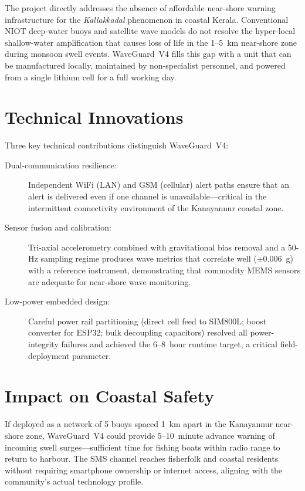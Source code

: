 The project directly addresses the absence of affordable near-shore warning
infrastructure for the \textit{Kallakkadal} phenomenon in coastal Kerala.
Conventional NIOT deep-water buoys and satellite wave models do not resolve the
hyper-local shallow-water amplification that causes loss of life in the 1--5~km
near-shore zone during monsoon swell events.
WaveGuard~V4 fills this gap with a unit that can be manufactured locally, maintained
by non-specialist personnel, and powered from a single lithium cell for a full working day.

\section{Technical Innovations}

Three key technical contributions distinguish WaveGuard~V4:

\begin{description}
  \item[Dual-communication resilience:]
        Independent WiFi (LAN) and GSM (cellular) alert paths ensure that an alert
        is delivered even if one channel is unavailable---critical in the intermittent
        connectivity environment of the Kanayannur coastal zone.

  \item[Sensor fusion and calibration:]
        Tri-axial accelerometry combined with gravitational bias removal and a 50-Hz
        sampling regime produces wave metrics that correlate well ($\pm$0.006~g) with
        a reference instrument, demonstrating that commodity MEMS sensors are
        adequate for near-shore wave monitoring.

  \item[Low-power embedded design:]
        Careful power rail partitioning (direct cell feed to SIM800L; boost converter
        for ESP32; bulk decoupling capacitors) resolved all power-integrity failures
        and achieved the 6--8~hour runtime target, a critical field-deployment
        parameter.
\end{description}

\section{Impact on Coastal Safety}

If deployed as a network of 5 buoys spaced 1~km apart in the Kanayannur near-shore
zone, WaveGuard~V4 could provide 5--10~minute advance warning of incoming swell
surges---sufficient time for fishing boats within radio range to return to harbour.
The SMS channel reaches fisherfolk and coastal residents without requiring
smartphone ownership or internet access, aligning with the community's actual
technology profile.

